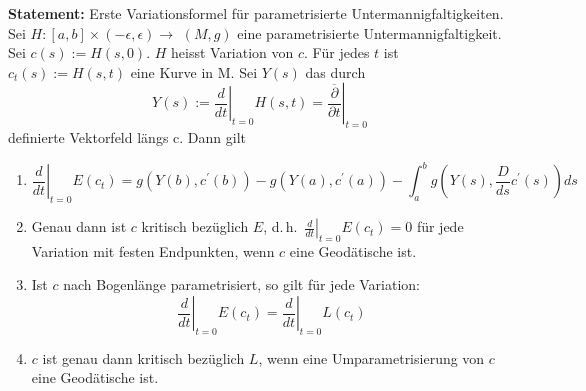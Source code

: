 \documentclass[10pt, letterpaper]{article}
\begin{document}
\textbf{Statement: }{Erste Variationsformel für parametrisierte Untermannigfaltigkeiten}.
Sei $H:[a, b] \times(-\epsilon, \epsilon) \rightarrow$ $(M, g)$ eine parametrisierte Untermannigfaltigkeit. Sei $c(s):=H(s, 0)$. $H$ heisst Variation von $c$. Für jedes $t$ ist $c_{t}(s):=H(s, t)$ eine Kurve in M. Sei $Y(s)$ das durch
$$
Y(s):=\left.\frac{d}{d t}\right|_{t=0} H(s, t)=\left.\overline{\frac{\partial}{\partial t}}\right|_{t=0}
$$
definierte Vektorfeld längs c. Dann gilt
\begin{enumerate}
  \item
  \[
  \left.\frac{d}{d t}\right|_{t=0} E\left(c_{t}\right) =
  g\left(Y(b), c^{\prime}(b)\right) - g\left(Y(a), c^{\prime}(a)\right)
  - \int_{a}^{b} g\left(Y(s), \frac{D}{d s} c^{\prime}(s)\right) d s
  \]

  \item Genau dann ist $c$ kritisch bezüglich $E$, d.\,h.\ $\left.\frac{d}{d t}\right|_{t=0} E(c_t) = 0$ für jede Variation mit festen Endpunkten, wenn $c$ eine Geodätische ist.

  \item Ist $c$ nach Bogenlänge parametrisiert, so gilt für jede Variation:
  \[
  \left.\frac{d}{d t}\right|_{t=0} E(c_t) = \left.\frac{d}{d t}\right|_{t=0} L(c_t)
  \]

  \item $c$ ist genau dann kritisch bezüglich $L$, wenn eine Umparametrisierung von $c$ eine Geodätische ist.
\end{enumerate}
\end{document}
